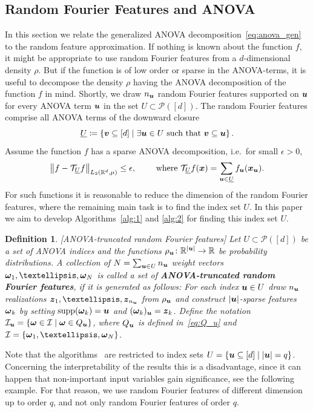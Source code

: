 \documentclass{article}
\renewcommand{\vec}[1]{\ensuremath \mathbf{\boldsymbol{#1}}}
\newcommand{\w}{\ensuremath{\vec \omega}}
\newcommand{\x}{\ensuremath{\vec x}}
\newcommand{\I}{\ensuremath{\mathcal{I}}}
\newcommand{\R}{\ensuremath{\mathbb{R}}}
\DeclareMathOperator*{\supp}{supp}
\newcommand{\norm}[1]{\left\lVert {#1} \right\rVert}    %
\newcommand{\TT}{\mathcal T}				%
\theoremstyle{definition}
\newtheorem{definition}[theorem]{Definition}
\newenvironment{Definition}{ \begin{definition}\normalfont\slshape}{\end{definition}}
\numberwithin{equation}{section}
\begin{document}
\subsection{Random  Fourier Features and ANOVA}\label{sec:RF_ANOVA}
In this section we relate the generalized ANOVA decomposition~\eqref{eq:anova_gen} to the random feature approximation. If nothing is known about the function $f$, it might be appropriate to use random Fourier features from a $d$-dimensional density $\rho$. But if the function is of low order or sparse in the ANOVA-terms, it is useful to decompose the density $\rho$ having the ANOVA decomposition of the function $f$ in mind. Shortly, we draw $n_{\vec u}$ random Fourier features supported on $\vec u$ for every ANOVA term $\vec u$ in the set $U\subset \mathcal P([d])$. The random Fourier features comprise all ANOVA terms of the downward closure
\begin{equation}\label{eq:under_U}
\underline U \coloneqq \left\{ \vec v \subseteq [d] \mid \exists \vec u\in U \text{ such that } \vec v\subseteq \vec u\right\}.
\end{equation}
Assume the function $f$ has a sparse ANOVA decomposition, i.e.~for small $\epsilon >0$, 
$$\norm{f-\TT_{ \underline{ U}} f}_{L_2(\R^d,\mu)} \leq \epsilon, \qquad \text{ where }  \TT_{ \underline{ U}} f(\x)= \sum_{\vec u \in  \underline{ U} } f_{\vec u}(\x_{\vec u}) .$$
For such functions it is reasonable to reduce the dimension of the random Fourier features, where the remaining main task is to find the index set $U$. In this paper we aim to develop Algorithms~\ref{alg:1} and \ref{alg:2} for finding this index set $U$.
\begin{Definition}[ANOVA-truncated random Fourier features]\label{def:ANOVA-features}
Let $U\subset \mathcal P([d])$ be a set of ANOVA indices and the functions $\rho_{\vec u}\colon \R^{|\vec u|}\rightarrow \R$ be probability distributions. A collection of $N = \sum_{\vec u\in U} n_{\vec u}$ weight vectors $\w_1,\ldots, \w_N$ is called a set of \textbf{ANOVA-truncated random Fourier features}, if it is generated as follows:
For each index $\vec u\in U$ draw $n_{\vec u}$ realizations $\vec z_1,\ldots,\vec z_{n_{\vec u}}$ from $\rho_{\vec u}$ and construct $|\vec u|$-sparse features $\w_k$ by setting $\supp(\w_k) = \vec u$ and $(\w_k)_{\vec u} = \vec z_k$.
Define the notation $\I_{\vec u} = \{\w \in \I \mid  \w \in Q_{\vec u} \} $, where $Q_{\vec u}$ is defined in~\eqref{eq:Q_u} and $\mathcal I = \{\w_1,\ldots,\w_N\}$.
\end{Definition}
Note that the algorithms~\cite{Ha23, HARFE23, Xie22} are restricted to index sets $U = \{\vec u \subseteq [d] \mid |\vec u| = q\}$. Concerning the interpretability of the results this is a disadvantage, since it can happen that non-important input variables gain significance, see the following example. 
For that reason, we use random Fourier features of different dimension up to order $q$, and not only random Fourier features of order $q$.
\end{document}
